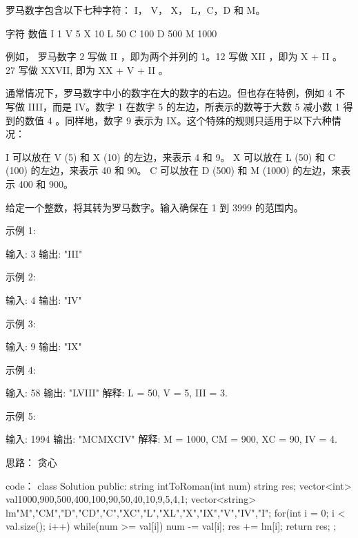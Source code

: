 罗马数字包含以下七种字符： I， V， X， L，C，D 和 M。

字符          数值
I             1
V             5
X             10
L             50
C             100
D             500
M             1000

例如， 罗马数字 2 写做 II ，即为两个并列的 1。12 写做 XII ，即为 X + II 。 27 写做  XXVII, 即为 XX + V + II 。

通常情况下，罗马数字中小的数字在大的数字的右边。但也存在特例，例如 4 不写做 IIII，而是 IV。数字 1 在数字 5 的左边，所表示的数等于大数 5 减小数 1 得到的数值 4 。同样地，数字 9 表示为 IX。这个特殊的规则只适用于以下六种情况：

    I 可以放在 V (5) 和 X (10) 的左边，来表示 4 和 9。
    X 可以放在 L (50) 和 C (100) 的左边，来表示 40 和 90。 
    C 可以放在 D (500) 和 M (1000) 的左边，来表示 400 和 900。

给定一个整数，将其转为罗马数字。输入确保在 1 到 3999 的范围内。

示例 1:

输入: 3
输出: "III"

示例 2:

输入: 4
输出: "IV"

示例 3:

输入: 9
输出: "IX"

示例 4:

输入: 58
输出: "LVIII"
解释: L = 50, V = 5, III = 3.

示例 5:

输入: 1994
输出: "MCMXCIV"
解释: M = 1000, CM = 900, XC = 90, IV = 4.




























思路：
贪心




































code：
class Solution {
public:
    string intToRoman(int num) {
        string res;
        vector<int> val{1000,900,500,400,100,90,50,40,10,9,5,4,1};
        vector<string> lm{"M","CM","D","CD","C","XC","L","XL","X","IX","V","IV","I"};
        for(int i = 0; i < val.size(); i++)
        {
            while(num >= val[i])
            {
                num -= val[i]; res += lm[i];
            }
        }
        return res;
    }
};